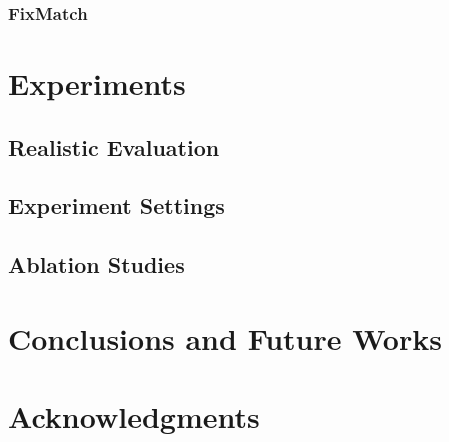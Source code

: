 \documentclass[11pt,oneside,a4paper]{book}
\theoremstyle{definition}
\DeclareRobustCommand{\[}{\begin{equation}}
\DeclareRobustCommand{\]}{\end{equation}}
\begin{document}
             \subsubsection{FixMatch}
                \cite{FixMatch}
             
\section{Experiments}
    \subsection{Realistic Evaluation}
    \subsection{Experiment Settings}
    \subsection{Ablation Studies}

\section{Conclusions and Future Works}
\section{Acknowledgments}

\small{


\clearpage
{}
}
\printindex
{}
\end{document}
